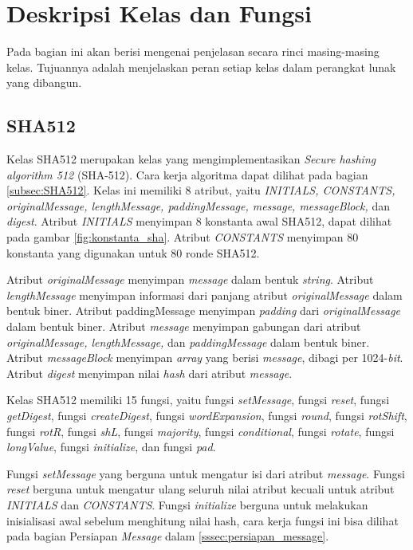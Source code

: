 \section{Deskripsi Kelas dan Fungsi}

Pada bagian ini akan berisi mengenai penjelasan secara rinci masing-masing kelas. Tujuannya adalah menjelaskan peran setiap kelas dalam perangkat lunak yang dibangun.

\subsection{SHA512}

Kelas SHA512 merupakan kelas yang mengimplementasikan \textit{Secure hashing algorithm 512} (SHA-512). Cara kerja algoritma dapat dilihat pada bagian \ref{subsec:SHA512}. Kelas ini memiliki 8 atribut, yaitu \textit{INITIALS, CONSTANTS, originalMessage, lengthMessage, paddingMessage, message, messageBlock,} dan \textit{digest}. Atribut \textit{INITIALS} menyimpan 8 konstanta awal SHA512, dapat dilihat pada gambar \ref{fig:konstanta_sha}. Atribut \textit{CONSTANTS} menyimpan 80 konstanta yang digunakan untuk 80 ronde SHA512.

Atribut \textit{originalMessage} menyimpan \textit{message} dalam bentuk \textit{string}. Atribut \textit{lengthMessage} menyimpan informasi dari panjang atribut \textit{originalMessage} dalam bentuk biner. Atribut paddingMessage menyimpan \textit{padding} dari \textit{originalMessage} dalam bentuk biner. Atribut \textit{message} menyimpan gabungan dari atribut \textit{originalMessage, lengthMessage,} dan \textit{paddingMessage} dalam bentuk biner. Atribut \textit{messageBlock} menyimpan \textit{array} yang berisi \textit{message}, dibagi per 1024-\textit{bit}. Atribut \textit{digest} menyimpan nilai \textit{hash} dari atribut \textit{message}.

Kelas SHA512 memiliki 15 fungsi, yaitu fungsi \textit{setMessage}, fungsi \textit{reset}, fungsi \textit{getDigest}, fungsi \textit{createDigest}, fungsi \textit{wordExpansion}, fungsi \textit{round}, fungsi \textit{rotShift}, fungsi \textit{rotR}, fungsi \textit{shL}, fungsi \textit{majority}, fungsi \textit{conditional}, fungsi \textit{rotate}, fungsi \textit{longValue}, fungsi \textit{initialize}, dan fungsi \textit{pad}.

Fungsi \textit{setMessage} yang berguna untuk mengatur isi dari atribut \textit{message}. Fungsi \textit{reset} berguna untuk mengatur ulang seluruh nilai atribut kecuali untuk atribut \textit{INITIALS} dan \textit{CONSTANTS}. Fungsi \textit{initialize} berguna untuk melakukan inisialisasi awal sebelum menghitung nilai hash, cara kerja fungsi ini bisa dilihat pada bagian Persiapan \textit{Message} dalam \ref{sssec:persiapan_message}.

